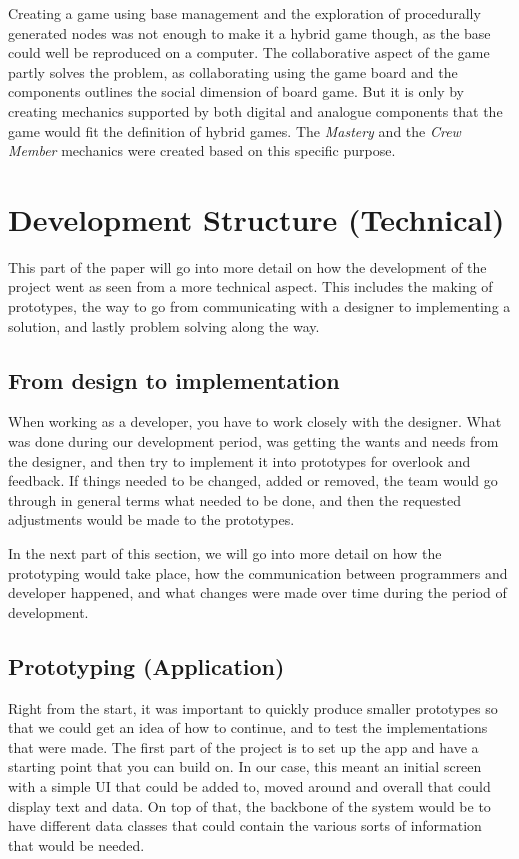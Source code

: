 Creating a game using base management and the exploration of procedurally generated nodes was not enough to make it a hybrid game though, as the base could well be reproduced on a computer. The collaborative aspect of the game partly solves the problem, as collaborating using the game board and the components outlines the social dimension of board game. But it is only by creating mechanics supported by both digital and analogue components that the game would fit the definition of hybrid games. The \textit{Mastery} and the \textit{Crew Member} mechanics were created based on this specific purpose.



\section{Development Structure (Technical)}
This part of the paper will go into more detail on how the development of the project went as seen from a more technical aspect. This includes the making of prototypes, the way to go from communicating with a designer to implementing a solution, and lastly problem solving along the way.

\subsection{From design to implementation}
When working as a developer, you have to work closely with the designer. What was done during our development period, was getting the wants and needs from the designer, and then try to implement it into prototypes for overlook and feedback. 
If things needed to be changed, added or removed, the team would go through in general terms what needed to be done, and then the requested adjustments would be made to the prototypes.

In the next part of this section, we will go into more detail on how the prototyping would take place, how the communication between programmers and developer happened, and what changes were made over time during the period of development.

\subsection{Prototyping (Application)}
Right from the start, it was important to quickly produce smaller prototypes so that we could get an idea of how to continue, and to test the implementations that were made. The first part of the project is to set up the app and have a starting point that you can build on. In our case, this meant an initial screen with a simple UI that could be added to, moved around and overall that could display text and data. On top of that, the backbone of the system would be to have different data classes that could contain the various sorts of information that would be needed.

